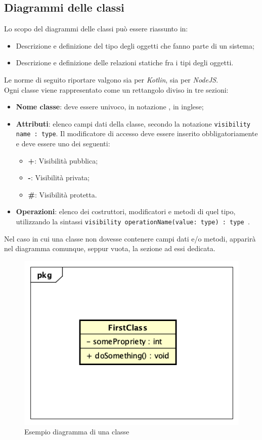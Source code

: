 \subsection{Diagrammi delle classi}
\label{DiagrammiDelleClassi}
Lo scopo del diagrammi delle classi può essere riassunto in:
\begin{itemize}
	\item Descrizione e definizione del tipo degli oggetti che fanno parte di un sistema;
	\item Descrizione e definizione delle relazioni statiche fra i tipi degli oggetti.
\end{itemize}
Le norme di seguito riportare valgono sia per \textit{Kotlin}, sia per \textit{NodeJS}.
\\
Ogni classe viene rappresentato come un rettangolo diviso in tre sezioni:
\begin{itemize}
	\item \textbf{Nome classe}: deve essere univoco, in notazione , in inglese;
	\item \textbf{Attributi}: elenco campi dati della classe, secondo la notazione \texttt{visibility name : type}. Il modificatore di accesso deve essere inserito obbligatoriamente e deve essere uno dei seguenti:
	\begin{itemize}
		\item \textbf{+}: Visibilità pubblica;
		\item \textbf{-}: Visibilità privata;
		\item \textbf{\#}: Visibilità protetta.
	\end{itemize}
	\item \textbf{Operazioni}: elenco dei costruttori, modificatori e metodi di quel tipo, utilizzando la sintassi \texttt{visibility operationName(value: type) : type }.
\end{itemize}
Nel caso in cui una classe non dovesse contenere campi dati e/o metodi, apparirà nel diagramma comunque, seppur vuota, la sezione ad essi dedicata. 
\begin{figure}[h]
	\centering
	\includegraphics[scale=0.5]{images/SchemaClasse.png}
	\caption{Esempio diagramma di una classe}\label{}
\end{figure}
